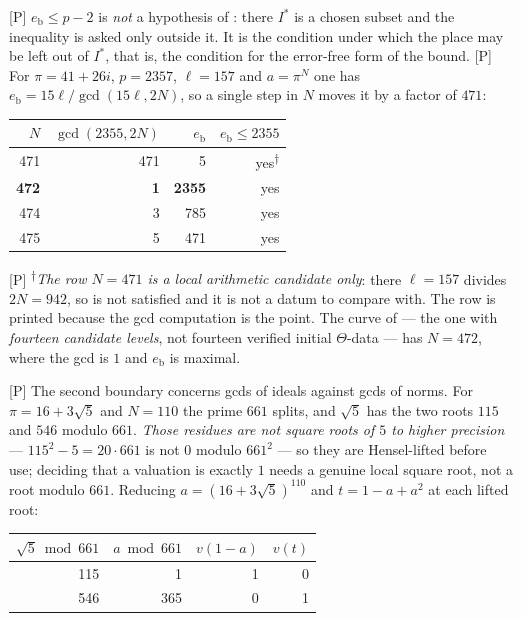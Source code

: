 \documentclass[11pt]{article}
\theoremstyle{plain}
\theoremstyle{definition}
\begin{document}
\textup{[P]} $e_{\mathrm b}\le p-2$ is \emph{not} a hypothesis of
\cite[Prop.~1.4(iii)]{IUT4}: there $I^{*}$ is a chosen subset and the inequality is
asked only outside it.  It is the condition under which the place may be left out of
$I^{*}$, that is, the condition for the error-free form of the bound.  \textup{[P]}
For $\pi=41+26i$, $p=2357$, $\ell=157$ and $a=\pi^{N}$ one has
$e_{\mathrm b}=15\ell/\gcd(15\ell,2N)$, so a single step in $N$ moves it by a factor of
$471$:

\begin{center}
\begin{tabular}{rrrr}
\toprule
$N$ & $\gcd(2355,2N)$ & $e_{\mathrm b}$ & $e_{\mathrm b}\le2355$\\
\midrule
471 & 471 & 5 & yes\textsuperscript{$\dagger$}\\
\textbf{472} & \textbf{1} & \textbf{2355} & yes\\
474 & 3 & 785 & yes\\
475 & 5 & 471 & yes\\
\bottomrule
\end{tabular}
\end{center}

\textup{[P]} \textsuperscript{$\dagger$}\emph{The row $N=471$ is a local arithmetic
candidate only}: there $\ell=157$ divides $2N=942$, so \cite[Def.~3.1(c)]{IUT1} is not
satisfied and it is not a datum to compare with.  The row is printed because the gcd
computation is the point.  The curve of \cite[\S13]{Second} --- the one with
\emph{fourteen candidate levels}, not fourteen verified initial $\Theta$-data --- has
$N=472$, where the gcd is $1$ and $e_{\mathrm b}$ is maximal.

\textup{[P]} The second boundary concerns gcds of ideals against gcds of norms.  For
$\pi=16+3\sqrt5$ and $N=110$ the prime $661$ splits, and $\sqrt5$ has the two roots
$115$ and $546$ modulo $661$.  \emph{Those residues are not square roots of $5$ to
higher precision} --- $115^{2}-5=20\cdot661$ is not $0$ modulo $661^{2}$ --- so they are
Hensel-lifted before use; deciding that a valuation is exactly $1$ needs a genuine
local square root, not a root modulo $661$.  Reducing $a=(16+3\sqrt5)^{110}$ and
$t=1-a+a^{2}$ at each lifted root:

\begin{center}
\begin{tabular}{rrrr}
\toprule
$\sqrt5\bmod661$ & $a\bmod661$ & $v(1-a)$ & $v(t)$\\
\midrule
115 & 1 & 1 & 0\\
546 & 365 & 0 & 1\\
\bottomrule
\end{tabular}
\end{center}
\end{document}
